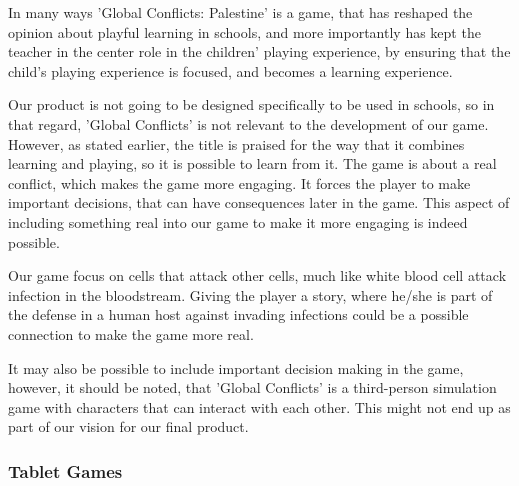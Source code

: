 In many ways 'Global Conflicts: Palestine' is a game, that has reshaped the opinion about playful learning in schools, and more importantly has kept the teacher in the center role in the children' playing experience, by ensuring that the child's playing experience is focused, and becomes a learning experience.\cite{laeringpaaspil}\newline

Our product is not going to be designed specifically to be used in schools, so in that regard, 'Global Conflicts' is not relevant to the development of our game.
However, as stated earlier, the title is praised for the way that it combines learning and playing, so it is possible to learn from it.
The game is about a real conflict, which makes the game more engaging.
It forces the player to make important decisions, that can have consequences later in the game.
This aspect of including something real into our game to make it more engaging is indeed possible.

Our game focus on cells that attack other cells, much like white blood cell attack infection in the bloodstream. Giving the player a story, where he/she is part of the defense in a human host against invading infections could be a possible connection to make the game more real.

It may also be possible to include important decision making in the game, however, it should be noted, that 'Global Conflicts' is a third-person simulation game with characters that can interact with each other. This might not end up as part of our vision for our final product.

\subsubsection{Tablet Games}


